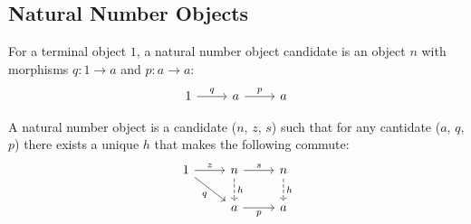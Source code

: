 \subsection{Natural Number Objects}
\begin{definition}
	For a terminal object $1$, a natural number object candidate is an object $n$
	with morphisms $q: 1 \to a$ and $p: a \to a$:
	\[\begin{tikzcd}[ampersand replacement=\&]
		1 \& a \& a
		\arrow["q", from=1-1, to=1-2]
		\arrow["p", from=1-2, to=1-3]
	\end{tikzcd}\]

	A natural number object is a candidate ($n$, $z$, $s$) such that for any
	cantidate ($a$, $q$, $p$) there exists a unique $h$ that makes the following
	commute: \parencite{awodey:category_theory}
	\[\begin{tikzcd}[ampersand replacement=\&]
		1 \& n \& n \\
		\& a \& a
		\arrow["z", from=1-1, to=1-2]
		\arrow["q"', from=1-1, to=2-2]
		\arrow["s", from=1-2, to=1-3]
		\arrow["p"', from=2-2, to=2-3]
		\arrow["h", dashed, from=1-2, to=2-2]
		\arrow["h", dashed, from=1-3, to=2-3]
	\end{tikzcd}\]
\end{definition}
